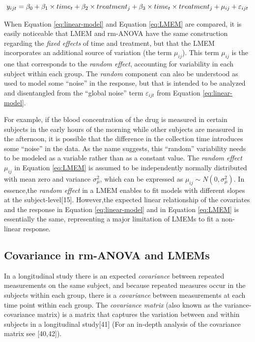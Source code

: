 \documentclass[
]{article}
\begin{document}
\begin{equation}
y_{ijt} = \beta_0+ \beta_1 \times time_{t} + \beta_2 \times treatment_{j} + \beta_3 \times time_{t}\times treatment_{j}+\mu_{ij} +\varepsilon_{ijt}\\ 
\label{eq:LMEM}
\end{equation}

When Equation \eqref{eq:linear-model} and Equation \eqref{eq:LMEM} are compared, it is easily noticeable that LMEM and rm-ANOVA have the same construction regarding the \emph{fixed effects} of time and treatment, but that the LMEM incorporates an additional source of variation (the term \(\mu_{ij}\)). This term \(\mu_{ij}\) is the one that corresponds to the \emph{random effect}, accounting for variability in each subject within each group. The \emph{random} component can also be understood as used to model some ``noise'' in the response, but that is intended to be analyzed and disentangled from the ``global noise'' term \(\varepsilon_{ijt}\) from Equation \eqref{eq:linear-model}.

For example, if the blood concentration of the drug is measured in certain subjects in the early hours of the morning while other subjects are measured in the afternoon, it is possible that the difference in the collection time introduces some ``noise'' in the data. As the name suggests, this ``random'' variability needs to be modeled as a variable rather than as a constant value. The \emph{random effect} \(\mu_{ij}\) in Equation \eqref{eq:LMEM} is assumed to be independently normally distributed with mean zero and variance \(\sigma^2_\mu\), which can be expressed as \(\mu_{ij} \sim N(0,\sigma^2_\mu)\). In essence,the \emph{random effect} in a LMEM enables to fit models with different slopes at the subject-level{[}15{]}. However,the expected linear relationship of the covariates and the response in Equation \eqref{eq:linear-model} and in Equation \eqref{eq:LMEM} is essentially the same, representing a major limitation of LMEMs to fit a non-linear response.

\hypertarget{covariance-in-rm-anova-and-lmems}{%
\subsection{Covariance in rm-ANOVA and LMEMs}\label{covariance-in-rm-anova-and-lmems}}

In a longitudinal study there is an expected \emph{covariance} between repeated measurements on the same subject, and because repeated measures occur in the subjects within each group, there is a \emph{covariance} between measurements at each time point within each group. The \emph{covariance matrix} (also known as the variance-covariance matrix) is a matrix that captures the variation between and within subjects in a longitudinal study{[}41{]} (For an in-depth analysis of the covariance matrix see {[}40,42{]}).
\end{document}
